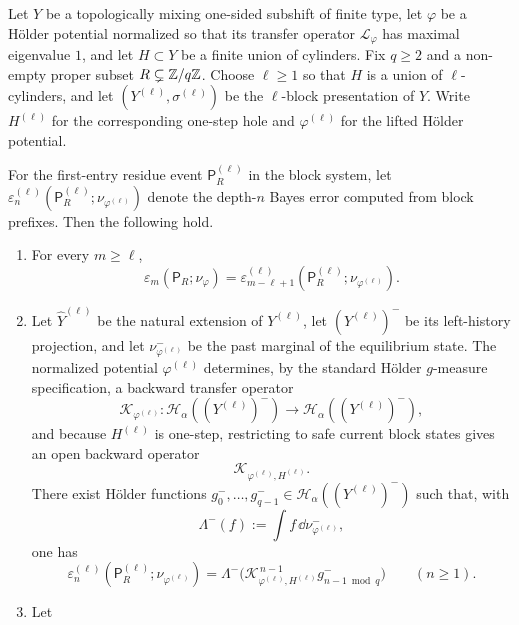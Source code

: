 \begin{theorem}
\label{thm:holder-open-resonance}
Let \(Y\) be a topologically mixing one-sided subshift of finite type,
let \(\varphi\) be a H\"older potential normalized so that its transfer
operator \(\mathcal L_\varphi\) has maximal eigenvalue \(1\), and let
\(H\subset Y\) be a finite union of cylinders.  Fix \(q\geq 2\) and a
non-empty proper subset \(R\subsetneq \mathbb{Z}/q\mathbb{Z}\).  Choose
\(\ell\geq 1\) so that \(H\) is a union of \(\ell\)-cylinders, and let
\((Y^{(\ell)},\sigma^{(\ell)})\) be the \(\ell\)-block presentation of
\(Y\).  Write \(H^{(\ell)}\) for the corresponding one-step hole and
\(\varphi^{(\ell)}\) for the lifted H\"older potential.

For the first-entry residue event \(\mathsf P_R^{(\ell)}\) in the block
system, let
\(\varepsilon_n^{(\ell)}(\mathsf P_R^{(\ell)};\nu_{\varphi^{(\ell)}})\)
denote the depth-\(n\) Bayes error computed from block prefixes.  Then
the following hold.
\begin{enumerate}[label=(\roman*)]
  \item For every \(m\geq \ell\),
    \[
      \varepsilon_m(\mathsf P_R;\nu_\varphi)
      =
      \varepsilon_{m-\ell+1}^{(\ell)}
        (\mathsf P_R^{(\ell)};\nu_{\varphi^{(\ell)}}).
    \]
  \item Let \(\widehat Y^{(\ell)}\) be the natural extension of
    \(Y^{(\ell)}\), let \((Y^{(\ell)})^{-}\) be its left-history
    projection, and let \(\nu_{\varphi^{(\ell)}}^{-}\) be the past
    marginal of the equilibrium state.  The normalized potential
    \(\varphi^{(\ell)}\) determines, by the standard H\"older
    \(g\)-measure specification, a backward transfer operator
    \[
      \mathcal K_{\varphi^{(\ell)}}
      : \mathcal H_\alpha((Y^{(\ell)})^{-})
      \to \mathcal H_\alpha((Y^{(\ell)})^{-}),
    \]
    and because \(H^{(\ell)}\) is one-step, restricting to safe current
    block states gives an open backward operator
    \[
      \mathcal K_{\varphi^{(\ell)},H^{(\ell)}}.
    \]
    There exist H\"older functions
    \(g_0^-,\ldots,g_{q-1}^-\in
      \mathcal H_\alpha((Y^{(\ell)})^{-})\)
    such that, with
    \[
      \Lambda^-(f)
      := \int f\,\dd\nu_{\varphi^{(\ell)}}^{-},
    \]
    one has
    \[
      \varepsilon_n^{(\ell)}
      (\mathsf P_R^{(\ell)};\nu_{\varphi^{(\ell)}})
      =
      \Lambda^-\bigl(
        \mathcal K_{\varphi^{(\ell)},H^{(\ell)}}^{\,n-1}
        g_{n-1\bmod q}^-
      \bigr)
      \qquad (n\geq 1).
    \]
  \item Let

\end{enumerate}
\end{theorem}
